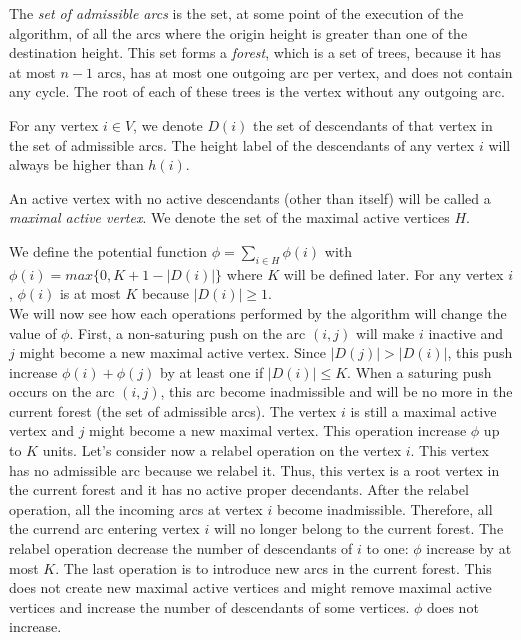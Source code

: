 The \textit{set of admissible arcs} is the set, at some point of the execution of the algorithm, of all the arcs where the origin height is greater than one of the destination height. This set forms a \textit{forest}, which is a set of trees, because it has at most $n - 1$ arcs, has at most one outgoing arc per vertex, and does not contain any cycle. The root of each of these trees is the vertex without any outgoing arc. 

For any vertex $i \in V$, we denote $D(i)$ the set of descendants of that vertex in the set of admissible arcs. The height label of the descendants of any vertex $i$ will always be higher than $h(i)$. 

An active vertex with no active descendants (other than itself) will be called a \textit{maximal active vertex}. We denote the set of the maximal active vertices $H$.

We define the potential function $\phi = \sum_{i \in H} \phi(i)$ with $\phi(i) = max\{0, K + 1 - |D(i)|\}$ where $K$ will be defined later. For any vertex $i$, $\phi(i)$ is at most $K$ because $|D(i)| \ge 1$.\\

We will now see how each operations performed by the algorithm will change the value of $\phi$. First, a non-saturing push on the arc $(i, j)$ will make $i$ inactive and $j$ might become a new maximal active vertex. Since $|D(j)| > |D(i)|$, this push increase $\phi(i) + \phi(j)$ by at least one if $|D(i)| \le K$. When a saturing push occurs on the arc $(i, j)$, this arc become inadmissible and will be no more in the current forest (the set of admissible arcs). The vertex $i$ is still a maximal active vertex and $j$ might become a new maximal vertex. This operation increase $\phi$ up to $K$ units. Let's consider now a relabel operation on the vertex $i$. This vertex has no admissible arc because we relabel it. Thus, this vertex is a root vertex in the current forest and it has no active proper decendants. After the relabel operation, all the incoming arcs at vertex $i$ become inadmissible. Therefore, all the currend arc entering vertex $i$ will no longer belong to the current forest. The relabel operation decrease the number of descendants of $i$ to one: $\phi$ increase by at most $K$. The last operation is to introduce new arcs in the current forest. This does not create new maximal active vertices and might remove maximal active vertices and increase the number of descendants of some vertices. $\phi$ does not increase.\\


